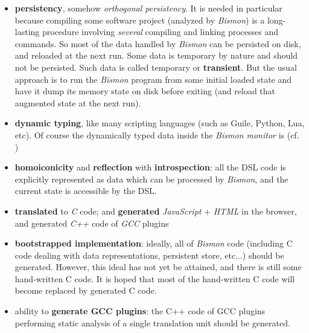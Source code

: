 \begin{itemize}

  \item \textbf{persistency}, somehow \textit{orthogonal
    persistency}. It is needed in particular because compiling some
    software project (analyzed by \textit{Bismon}) is a long-lasting
    procedure involving \textit{several} compiling and linking
    processes and commands. So most of the data handled by
    \textit{Bismon} can be persisted on disk, and reloaded at the next
    run. Some data is temporary by nature and should not be
    persisted. Such data is called temporary or
    \textbf{transient}. But the usual approach is to run the
    \textit{Bismon} program from some initial loaded state and have it
    dump its memory state on disk before exiting (and reload that
    augmented state at the next run).

  \item \textbf{dynamic typing}, like many scripting languages (such
    as Guile, Python, Lua, etc). Of course the dynamically typed data
    inside the \textit{Bismon monitor} is  (cf. \cite{Jones:2011:GC-handbook})

  \item \textbf{homoiconicity} and \textbf{reflection} with
    \textbf{introspection}: all the DSL code is explicitly represented
    as data which can be processed by \textit{Bismon}, and the current
    state is accessible by the DSL.

    \item \textbf{translated} to \emph{C} code; and \textbf{generated}
      \emph{JavaScript} + \emph{HTML} in the browser, and generated
      \emph{C++} code of \emph{GCC} plugins

    \item \textbf{bootstrapped implementation}: ideally, all of
      \textit{Bismon} code (including C code dealing with data
      representations, persistent store, etc...) should be
      generated. However, this ideal has not yet be attained, and
      there is still some hand-written C code. It is hoped that most
      of the hand-written C code will become replaced by generated C
      code.
    \item ability to \textbf{generate GCC plugins}: the C++ code of
      GCC plugins performing static analysis of a single translation
      unit should be generated.


\end{itemize}
